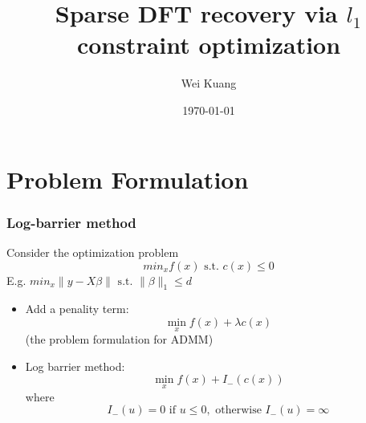 \documentclass{beamer}
\title[Sparse DFT recovery]{Sparse DFT recovery via $l_1$ constraint optimization } %
\author{Wei Kuang} %
\institute[UChicago] %
{
Department of Statistics, University of Chicago \\ %
\medskip
\textit{weikuang@uchicago.edu} %
}
\date{\today} %
\begin{document}




\section{Problem Formulation} %

\begin{frame}
\frametitle{Log-barrier method}
Consider the optimization problem
\begin{equation}
    min_x f(x)\text{ s.t. }c(x)\leq 0
\end{equation}
E.g. $min_x \|y-X \beta\| \text{ s.t. } \|\beta\|_1\leq d$
\begin{itemize}
    \item Add a penality term: 
    $$\min_x f(x)+\lambda c(x)$$
    (the problem formulation for ADMM)
    \item Log barrier method: 
    $$\min_x f(x)+I_{-}(c(x))$$
    where
    $$
    I_{-}(u) = 0 \text{ if } u\leq 0, \text{ otherwise }I_{-}(u)=\infty
    $$
\end{itemize}
\end{frame}
\end{document}
